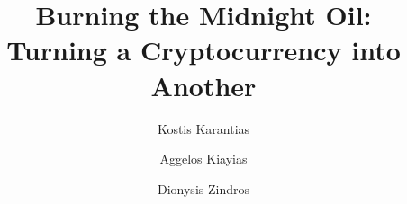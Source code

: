 \title{
Burning the Midnight Oil:\\
Turning a Cryptocurrency into Another
}

\ifanonymous
   \author{}
   \institute{}
\else
   \author{
           Kostis Karantias  \and
           Aggelos Kiayias  \and
           Dionysis Zindros 
   }
\fi
\maketitle
